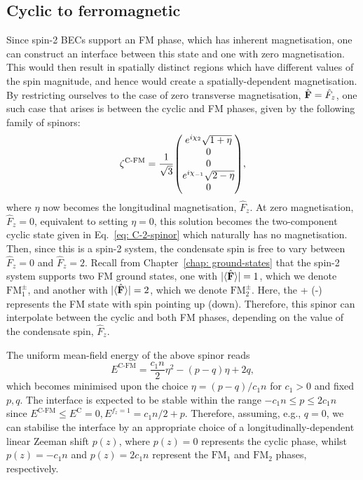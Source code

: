\subsection{Cyclic to ferromagnetic}\label{sec: spin-2-C-FM}
Since spin-2 BECs support an FM phase, which has inherent
magnetisation, one can construct an interface between this state and
one with zero magnetisation.
This would then result in spatially distinct regions which have different values
of the spin magnitude, and hence would create a spatially-dependent
magnetisation.
By restricting ourselves to the case of zero transverse magnetisation,
\(\hat{\vb{F}} = \hat{F}_z\), one such case that arises is between the cyclic
and FM phases, given by the following family of spinors:
\begin{align}\label{eq: C-FM-interpolating-spinor}
    \zeta^\text{C-FM} = \frac{1}{\sqrt{3}}\mqty(
        e^{i\chi_2}\sqrt{1 + \eta} \\
        0 \\
        0 \\
        e^{i\chi_{-1}}\sqrt{2 - \eta} \\
        0
    ),
\end{align}
where \(\eta \) now becomes the longitudinal magnetisation, \(\hat{F}_z\).
At zero magnetisation, \(\hat{F}_z = 0\), equivalent to setting \(\eta=0\), this
solution becomes the two-component cyclic state given in
Eq.~\eqref{eq: C-2-spinor} which naturally has no magnetisation.
Then, since this is a spin-2 system, the condensate spin is free to vary between
\(\hat{F}_z = 0\) and \(\hat{F}_z = 2\).
Recall from Chapter~\ref{chap: ground-states} that the spin-2 system supports
two FM ground states, one with \(|\langle \hat{\vb{F}} \rangle | = 1\), which we denote
\(\text{FM}_1^\pm\), and another with \(|\langle \hat{\vb{F}} \rangle | = 2\), which we denote
\(\text{FM}_2^\pm\).
Here, the + (-) represents the FM state with spin pointing up (down).
Therefore, this spinor can interpolate between the cyclic and both FM phases,
depending on the value of the condensate spin, \(\hat{F}_z\).

The uniform mean-field energy of the above spinor reads
\begin{equation}
    E^\text{C-FM} = \frac{c_1 n}{2} \eta^2 - (p-q)\eta + 2q,
\end{equation}
which becomes minimised upon the choice \(\eta = (p-q)/c_1n\) for \(c_1 > 0\)
and fixed \(p, q\).
The interface is expected to be stable within the range
\(-c_1n \leq p \leq 2c_1n\) since \(E^\text{C-FM} \leq
E^\text{C}=0, E^{f_z=1} = c_1n/2 + p\).
Therefore, assuming, e.g., \(q=0\), we can stabilise the interface by an
appropriate choice of a longitudinally-dependent linear Zeeman shift \(p(z)\),
where \(p(z) = 0\) represents the cyclic phase, whilst \(p(z) = -c_1n\) and
\(p(z) = 2c_1n\) represent the \(\text{FM}_1\) and \(\text{FM}_2\) phases,
respectively.

